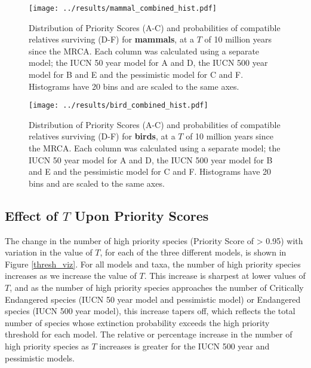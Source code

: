 \documentclass[12pt]{article}
\begin{document}
	
	\begin{figure}
		\centering
		\texttt{[image: ../results/mammal\_combined\_hist.pdf]}
		\caption{Distribution of Priority Scores (A-C) and probabilities of
			compatible relatives surviving (D-F) for \textbf{mammals}, at a $T$
			of 10 million years since the MRCA. Each column was calculated using a
			separate model; the IUCN 50 year model for A and D, the IUCN 500 year
			model for B and E and the pessimistic model for C and F.
			Histograms have 20 bins and are scaled to the same axes.
			}\label{mammal_hist}
	\end{figure}
	
	\begin{figure}
		\centering
		\texttt{[image: ../results/bird\_combined\_hist.pdf]}
		\caption{Distribution of Priority Scores (A-C) and probabilities of
			compatible relatives surviving (D-F) for \textbf{birds}, at a $T$
			of 10 million years since the MRCA. Each column was calculated using a
			separate model; the IUCN 50 year model for A and D, the IUCN 500 year
			model for B and E and the pessimistic model for C and F.
			Histograms have 20 bins and are scaled to the same axes.
			}\label{bird_hist}
	\end{figure}


	\subsection{Effect of $T$ Upon Priority Scores}
	The change in the number of high priority species (Priority Score of > 0.95)
	with variation in the value of $T$, for each of the three different models, is
	shown in Figure \ref{thresh_viz}. For all models and taxa, the number of high
	priority species increases as we increase the value of $T$. This increase
	is sharpest at lower values of $T$, and as the number of high priority
	species approaches the number of Critically Endangered species (IUCN 
	50 year model and pessimistic model) or Endangered species (IUCN 500 year
	model), this increase tapers off, which reflects the total number of species
	whose extinction probability exceeds the high priority threshold for
	each model. The relative or percentage increase in the number of high
	priority species as $T$ increases
	is greater for the IUCN 500 year and pessimistic models.
	
\end{document}
